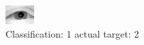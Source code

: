 \begin{figure}[h!]
\begin{center}
\includegraphics[width=0.60\columnwidth]{figures/ID2222_class_1_target_2.png}
\end{center}
\caption{ Classification: 1 actual target: 2}
\label{fig:ID2222_class_1_target_2}
\end{figure}
